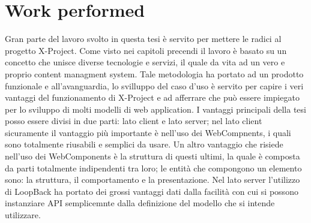 \section{Work performed}
\label{sec:conclusions_work_performed}

Gran parte del lavoro svolto in questa tesi è servito per mettere le radici al progetto X-Project. Come visto nei capitoli precendi il lavoro è basato su un concetto che unisce diverse tecnologie e servizi, il quale da vita ad un vero e proprio content managment system. 
Tale metodologia ha portato ad un prodotto funzionale e all'avanguardia, lo svilluppo del caso d'uso è servito per capire i veri vantaggi del funzionamento di X-Project e ad afferrare che può essere impiegato per lo sviluppo di molti modelli di web application.
I vantaggi principali della tesi posso essere divisi in due parti: lato client e lato server; nel lato client sicuramente il vantaggio più importante è nell'uso dei WebCompnents, i quali sono totalmente riusabili e semplici da usare. Un altro vantaggio che risiede nell'uso dei WebComponents è la struttura di questi ultimi, la quale è composta da parti totalmente indipendenti tra loro; le entità che compongono un elemento sono: la struttura, il comportamento e la presentazione.
Nel lato server l'utilizzo di LoopBack ha portato dei grossi vantaggi dati dalla facilità con cui si possono instanziare API semplicemnte dalla definizione del modello che si intende utilizzare.